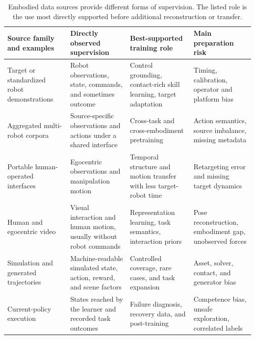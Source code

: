 \begin{table}[t]
\centering
\caption{Embodied data sources provide different forms of supervision. The listed role is the use most directly supported before additional reconstruction or transfer.}
\label{tab:source-roles}
\scriptsize
\setlength{\tabcolsep}{4pt}
\renewcommand{\arraystretch}{1.08}
\begin{tabularx}{\textwidth}{@{}p{3.1cm}p{3.7cm}p{4.0cm}X@{}}
\toprule
Source family and examples & Directly observed supervision & Best-supported training role & Main preparation risk \\
\midrule
Target or standardized robot demonstrations~\cite{khazatsky2024droid_2403_12945,walke2023bridgedata_2308_12952,fang2023rh20t_2307_00595}
& Robot observations, state, commands, and sometimes outcome
& Control grounding, contact-rich skill learning, target adaptation
& Timing, calibration, operator and platform bias \\
Aggregated multi-robot corpora~\cite{collaboration2023open_2310_08864}
& Source-specific observations and actions under a shared interface
& Cross-task and cross-embodiment pretraining
& Action semantics, source imbalance, missing metadata \\
Portable human-operated interfaces~\cite{chi2024universal_2402_10329}
& Egocentric observations and manipulation motion
& Temporal structure and motion transfer with less target-robot time
& Retargeting error and missing target dynamics \\
Human and egocentric video~\cite{kareer2024egomimic_2410_24221,singh2024hand_2409_08273}
& Visual interaction and human motion, usually without robot commands
& Representation learning, task semantics, interaction priors
& Pose reconstruction, embodiment gap, unobserved forces \\
Simulation and generated trajectories~\cite{mandlekar2023mimicgen_2310_17596,wang2023gensim_2310_01361,wang2023robogen_2311_01455}
& Machine-readable simulated state, action, reward, and scene factors
& Controlled coverage, rare cases, and task expansion
& Asset, solver, contact, and generator bias \\
Current-policy execution~\cite{ahn2024autort_2401_12963}
& States reached by the learner and recorded task outcomes
& Failure diagnosis, recovery data, and post-training
& Competence bias, unsafe exploration, correlated labels \\
\bottomrule
\end{tabularx}
\end{table}
